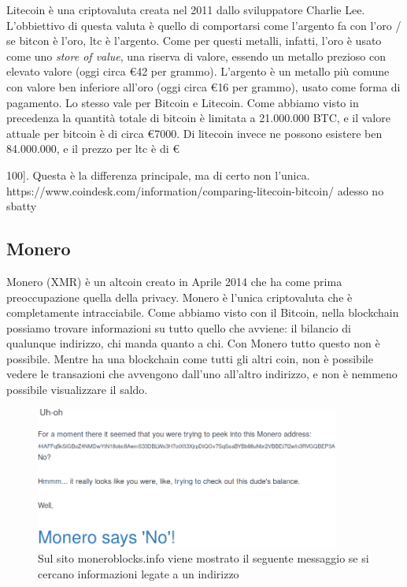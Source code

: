 \documentclass {article}
\begin{document}
Litecoin è una criptovaluta creata nel 2011 dallo sviluppatore Charlie Lee. L'obbiettivo di questa valuta è quello di comportarsi come l'argento fa con l'oro  /  se bitcon è l'oro, ltc è l'argento.
Come per questi metalli, infatti, l'oro è usato come uno \textit{store of value}, una riserva di valore, essendo un metallo prezioso con elevato valore (oggi circa \euro{42} per grammo). L'argento è un metallo più comune con valore ben inferiore all'oro (oggi circa \euro{16} per grammo), usato come forma di pagamento.
Lo stesso vale per Bitcoin e Litecoin. Come abbiamo visto in precedenza la quantità totale di bitcoin è limitata a 21.000.000 BTC, e il valore attuale per bitcoin è di circa \euro{7000}. Di litecoin invece ne possono esistere ben 84.000.000, e il prezzo per ltc è di \euro{100].
Questa è la differenza principale, ma di certo non l'unica.
https://www.coindesk.com/information/comparing-litecoin-bitcoin/ adesso no sbatty


\subsection {Monero}


Monero (XMR) è un altcoin creato in Aprile 2014 che ha come prima preoccupazione quella della privacy.
Monero è l'unica criptovaluta che è completamente intracciabile. Come abbiamo visto con il Bitcoin, nella blockchain possiamo trovare informazioni su tutto quello che avviene: il bilancio di qualunque indirizzo, chi manda quanto a chi.
Con Monero tutto questo non è possibile. Mentre ha una blockchain come tutti gli altri coin, non è possibile vedere le transazioni che avvengono dall'uno all'altro indirizzo, e non è nemmeno possibile visualizzare il saldo.

\vspace {0.5cm}
\begin {figure}[h]
\includegraphics [width = 10cm] {media/monero.png}
\caption {Sul sito moneroblocks.info viene mostrato il seguente messaggio se si cercano informazioni legate a un indirizzo}
\end {figure}
\vspace {0.5cm}

}
\end{document}

